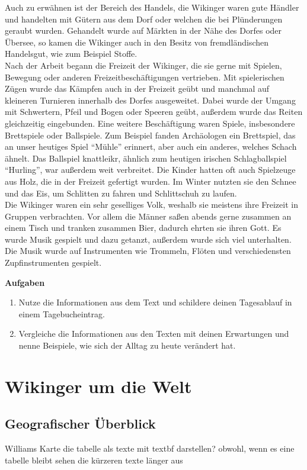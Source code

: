\documentclass[12pt,a4paper,ngerman,openany]{book}
\newcommand{\aufgaben}[1]{
  \begin{tcolorbox}
    \textbf{Aufgaben}
    \begin{enumerate}
      #1
    \end{enumerate}
  \end{tcolorbox}
} %
\newcommand{\fchapter}[1]{\chapter{#1}\thispagestyle{chapterstyle}}
\begin{document}
Auch zu erwähnen ist der Bereich des Handels, die Wikinger waren gute Händler und handelten mit Gütern aus dem Dorf oder welchen die bei Plünderungen geraubt wurden. Gehandelt wurde auf Märkten in der Nähe des Dorfes oder Übersee, so kamen die Wikinger auch in den Besitz von fremdländischen Handelsgut, wie zum Beispiel Stoffe.\\
Nach der Arbeit begann die Freizeit der Wikinger, die sie gerne mit Spielen, Bewegung oder anderen Freizeitbeschäftigungen vertrieben.
Mit spielerischen Zügen wurde das Kämpfen auch in der Freizeit geübt und manchmal auf kleineren Turnieren innerhalb des Dorfes ausgeweitet. Dabei wurde der Umgang mit Schwertern, Pfeil und Bogen oder Speeren geübt, außerdem wurde das Reiten gleichzeitig eingebunden. Eine weitere Beschäftigung waren Spiele, insbesondere Brettspiele oder Ballspiele. Zum Beispiel fanden Archäologen ein Brettspiel, das an unser heutiges Spiel “Mühle” erinnert, aber auch ein anderes, welches Schach ähnelt. Das Ballspiel knattleikr, ähnlich zum heutigen irischen Schlagballspiel “Hurling”, war außerdem weit verbreitet. Die Kinder hatten oft auch Spielzeuge aus Holz, die in der Freizeit gefertigt wurden. Im Winter nutzten sie den Schnee und das Eis, um Schlitten zu fahren und Schlittschuh zu laufen.\\
Die Wikinger waren ein sehr geselliges Volk, weshalb sie meistens ihre Freizeit in Gruppen verbrachten.
Vor allem die Männer saßen abends gerne zusammen an einem Tisch und tranken zusammen Bier, dadurch ehrten sie ihren Gott. Es wurde Musik gespielt und dazu getanzt, außerdem wurde sich viel unterhalten. Die Musik wurde auf Instrumenten wie Trommeln, Flöten und verschiedensten Zupfinstrumenten gespielt.


\aufgaben{
  \item Nutze die Informationen aus dem Text und schildere deinen Tagesablauf in einem Tagebucheintrag.
  \item Vergleiche die Informationen aus den Texten mit deinen Erwartungen und nenne Beispiele, wie sich der Alltag zu heute verändert hat.
}

\fchapter{Wikinger um die Welt}

\section{Geografischer Überblick}

Williams Karte
die tabelle als texte mit textbf darstellen?
obwohl, wenn es eine tabelle bleibt sehen die kürzeren texte länger aus
\end{document}
